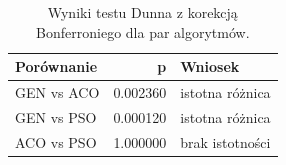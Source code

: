 \begin{table}
\caption{Wyniki testu Dunna z korekcją Bonferroniego dla par algorytmów.}
\label{tab:dunn_pairs}
\begin{tabular}{lrl}
\toprule
Porównanie & p & Wniosek \\
\midrule
GEN vs ACO & 0.002360 & istotna różnica \\
GEN vs PSO & 0.000120 & istotna różnica \\
ACO vs PSO & 1.000000 & brak istotności \\
\bottomrule
\end{tabular}
\end{table}
